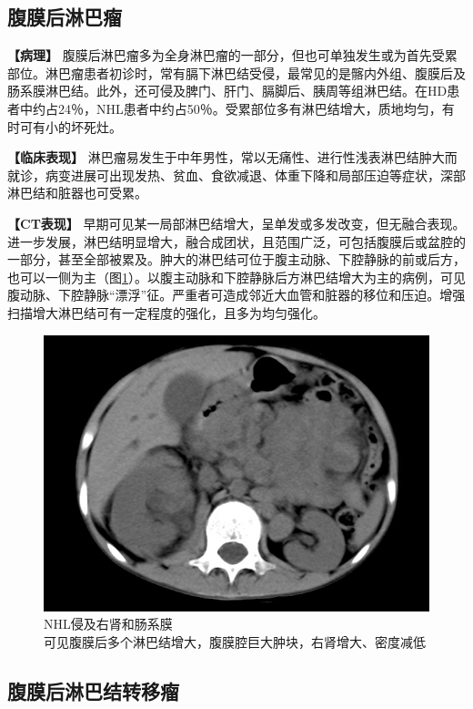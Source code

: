 \subsection{腹膜后淋巴瘤}

\textbf{【病理】}
腹膜后淋巴瘤多为全身淋巴瘤的一部分，但也可单独发生或为首先受累部位。淋巴瘤患者初诊时，常有膈下淋巴结受侵，最常见的是髂内外组、腹膜后及肠系膜淋巴结。此外，还可侵及脾门、肝门、膈脚后、胰周等组淋巴结。在HD患者中约占24％，NHL患者中约占50％。受累部位多有淋巴结增大，质地均匀，有时可有小的坏死灶。

\textbf{【临床表现】}
淋巴瘤易发生于中年男性，常以无痛性、进行性浅表淋巴结肿大而就诊，病变进展可出现发热、贫血、食欲减退、体重下降和局部压迫等症状，深部淋巴结和脏器也可受累。

\textbf{【CT表现】}
早期可见某一局部淋巴结增大，呈单发或多发改变，但无融合表现。进一步发展，淋巴结明显增大，融合成团状，且范围广泛，可包括腹膜后或盆腔的一部分，甚至全部被累及。肿大的淋巴结可位于腹主动脉、下腔静脉的前或后方，也可以一侧为主（图\ref{fig19-4}）。以腹主动脉和下腔静脉后方淋巴结增大为主的病例，可见腹动脉、下腔静脉“漂浮”征。严重者可造成邻近大血管和脏器的移位和压迫。增强扫描增大淋巴结可有一定程度的强化，且多为均匀强化。

\begin{figure}[!htbp]
 \centering
 \includegraphics[width=.7\textwidth,height=\textheight,keepaspectratio]{./images/Image00385.jpg}
 \captionsetup{justification=centering}
 \caption{NHL侵及右肾和肠系膜\\{\small 可见腹膜后多个淋巴结增大，腹膜腔巨大肿块，右肾增大、密度减低}}
 \label{fig19-4}
  \end{figure} 

\subsection{腹膜后淋巴结转移瘤}

